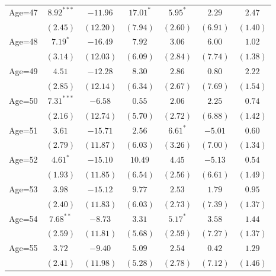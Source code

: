 \documentclass[fullpage]{paper}
\begin{document}
\begin{center}
\begin{longtable}{l c c c c c c }
Age=47      & $8.92^{***}$  & $-11.96$     & $17.01^{*}$   & $5.95^{*}$   & $2.29$        & $2.47$        \\
            & $(2.45)$      & $(12.20)$    & $(7.94)$      & $(2.60)$     & $(6.91)$      & $(1.40)$      \\
Age=48      & $7.19^{*}$    & $-16.49$     & $7.92$        & $3.06$       & $6.00$        & $1.02$        \\
            & $(3.14)$      & $(12.03)$    & $(6.09)$      & $(2.84)$     & $(7.74)$      & $(1.38)$      \\
Age=49      & $4.51$        & $-12.28$     & $8.30$        & $2.86$       & $0.80$        & $2.22$        \\
            & $(2.85)$      & $(12.14)$    & $(6.34)$      & $(2.67)$     & $(7.69)$      & $(1.54)$      \\
Age=50      & $7.31^{***}$  & $-6.58$      & $0.55$        & $2.06$       & $2.25$        & $0.74$        \\
            & $(2.16)$      & $(12.74)$    & $(5.70)$      & $(2.72)$     & $(6.88)$      & $(1.42)$      \\
Age=51      & $3.61$        & $-15.71$     & $2.56$        & $6.61^{*}$   & $-5.01$       & $0.60$        \\
            & $(2.79)$      & $(11.87)$    & $(6.03)$      & $(3.26)$     & $(7.00)$      & $(1.34)$      \\
Age=52      & $4.61^{*}$    & $-15.10$     & $10.49$       & $4.45$       & $-5.13$       & $0.54$        \\
            & $(1.93)$      & $(11.85)$    & $(6.54)$      & $(2.56)$     & $(6.61)$      & $(1.49)$      \\
Age=53      & $3.98$        & $-15.12$     & $9.77$        & $2.53$       & $1.79$        & $0.95$        \\
            & $(2.40)$      & $(11.83)$    & $(6.03)$      & $(2.73)$     & $(7.39)$      & $(1.37)$      \\
Age=54      & $7.68^{**}$   & $-8.73$      & $3.31$        & $5.17^{*}$   & $3.58$        & $1.44$        \\
            & $(2.59)$      & $(11.81)$    & $(5.68)$      & $(2.59)$     & $(7.27)$      & $(1.37)$      \\
Age=55      & $3.72$        & $-9.40$      & $5.09$        & $2.54$       & $0.42$        & $1.29$        \\
            & $(2.41)$      & $(11.98)$    & $(5.28)$      & $(2.78)$     & $(7.12)$      & $(1.46)$      \\

\end{longtable}
\end{center}
\end{document}
